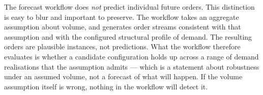 The forecast workflow does \emph{not} predict individual future orders. This distinction is
easy to blur and important to preserve. The workflow takes an aggregate assumption about
volume, and generates order streams consistent with that assumption and with the configured
structural profile of demand. The resulting orders are plausible instances, not predictions.
What the workflow therefore evaluates is whether a candidate configuration holds up across a
range of demand realisations that the assumption admits --- which is a statement about
robustness under an assumed volume, not a forecast of what will happen. If the volume
assumption itself is wrong, nothing in the workflow will detect it.
